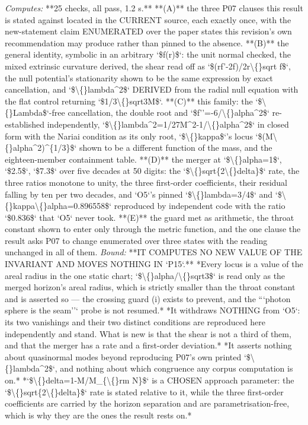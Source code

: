 \begin{description}
\emph{Computes:} **25 checks, all pass, 1.2 s.** **(A)** the three P07 clauses this result is stated against located in the CURRENT source, each exactly once, with the new-statement claim ENUMERATED over the paper states this revision's own recommendation may produce rather than pinned to the absence. **(B)** the general identity, symbolic in an arbitrary `\$f(r)\$`: the unit normal checked, the mixed extrinsic curvature derived, the shear read off as `\$(rf'-2f)/2r\textbackslash\{\}sqrt f\$`, the null potential's stationarity shown to be the same expression by exact cancellation, and `\$\textbackslash\{\}lambda\textasciicircum{}2\$` DERIVED from the radial null equation with the flat control returning `\$1/3\textbackslash\{\}sqrt3M\$`. **(C)** this family: the `\$\textbackslash\{\}Lambda\$`-free cancellation, the double root and `\$f''=-6/\textbackslash\{\}alpha\textasciicircum{}2\$` re-established independently, `\$\textbackslash\{\}lambda\textasciicircum{}2=1/27M\textasciicircum{}2-1/\textbackslash\{\}alpha\textasciicircum{}2\$` in closed form with the Nariai condition as its only root, `\$\textbackslash\{\}kappa\$`'s locus `\$(M\textbackslash\{\}alpha\textasciicircum{}2)\textasciicircum{}\{1/3\}\$` shown to be a different function of the mass, and the eighteen-member containment table. **(D)** the merger at `\$\textbackslash\{\}alpha=1\$`, `\$2.5\$`, `\$7.3\$` over five decades at 50 digits: the `\$\textbackslash\{\}sqrt\{2\textbackslash\{\}delta\}\$` rate, the three ratios monotone to unity, the three first-order coefficients, their residual falling by ten per two decades, and `O5`'s pinned `\$\textbackslash\{\}lambda=3/4\$` and `\$\textbackslash\{\}kappa\textbackslash\{\}alpha=0.896558\$` reproduced by independent code with the ratio `\$0.836\$` that `O5` never took. **(E)** the guard met as arithmetic, the throat constant shown to enter only through the metric function, and the one clause the result asks P07 to change enumerated over three states with the reading unchanged in all of them.
 \emph{Bound:}  **IT COMPUTES NO NEW VALUE OF THE INVARIANT AND MOVES NOTHING IN `P15`.** *Every locus is a value of the areal radius in the one static chart; `\$\textbackslash\{\}alpha/\textbackslash\{\}sqrt3\$` is read only as the merged horizon's areal radius, which is strictly smaller than the throat constant and is asserted so --- the crossing guard (i) exists to prevent, and the ```photon sphere is the seam''` probe is not resumed.*  *It withdraws NOTHING from `O5`: its two vanishings and their two distinct conditions are reproduced here independently and stand. What is new is that the shear is not a third of them, and that the merger has a rate and a first-order deviation.*  *It asserts nothing about quasinormal modes beyond reproducing P07's own printed `\$\textbackslash\{\}lambda\textasciicircum{}2\$`, and nothing about which congruence any corpus computation is on.*  *`\$\textbackslash\{\}delta=1-M/M\_\{\textbackslash\{\}rm N\}\$` is a CHOSEN approach parameter: the `\$\textbackslash\{\}sqrt\{2\textbackslash\{\}delta\}\$` rate is stated relative to it, while the three first-order coefficients are carried by the horizon separation and are parametrisation-free, which is why they are the ones the result rests on.*

\end{description}
